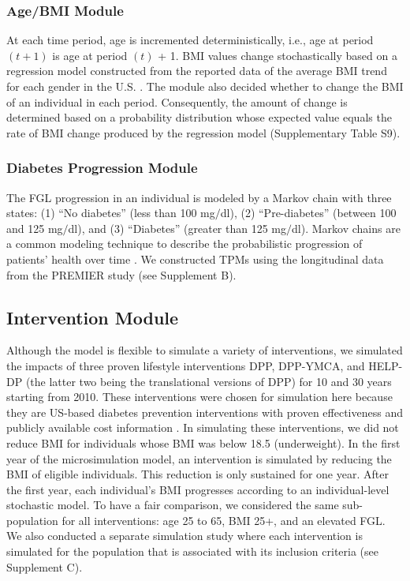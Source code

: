 \documentclass[fleqn,10pt]{wlscirep}
\begin{document}
\subsubsection*{Age/BMI Module}
At each time period, age is incremented deterministically, i.e., age at period $(t+1)$ is age at period $(t)$ + 1. BMI values change stochastically based on a regression model constructed from the reported data of the average BMI trend for each gender in the U.S. \cite{mcdowell:anthropometric:2005,mcdowell:anthropometric:2008,fryar:anthropometric:2012}. The module also decided whether to change the BMI of an individual in each period. Consequently, the amount of change is determined based on a probability distribution whose expected value equals the rate of BMI change produced by the regression model (Supplementary Table S9).

\subsubsection*{Diabetes Progression Module}
The FGL progression in an individual is modeled by a Markov chain with three states: (1) ``No diabetes'' (less than 100 mg$/$dl), (2) ``Pre-diabetes'' (between 100 and 125 mg$/$dl), and (3) ``Diabetes'' (greater than 125 mg$/$dl). Markov chains are a common modeling technique to describe the probabilistic progression of patients’ health over time \cite{sonnenberg:markov:1993}. We constructed TPMs using the longitudinal data from the PREMIER study (see Supplement B).

\subsection*{Intervention Module} 
Although the model is flexible to simulate a variety of interventions, we simulated the impacts of three proven lifestyle interventions DPP, DPP-YMCA, and HELP-DP (the latter two being the translational versions of DPP) for 10 and 30 years starting from 2010. 
These interventions were chosen for simulation here because they are US-based diabetes prevention interventions with proven effectiveness and publicly available cost information \cite{group:costs:2003,lawlor:cost:2013,ackermann:adapting:2007,vojta:2013:coordinated}.
In simulating these interventions, we did not reduce BMI for individuals whose BMI was below 18.5 (underweight). In the first year of the microsimulation model, an intervention is simulated by reducing the BMI of eligible individuals. This reduction is only sustained for one year. After the first year, each individual's BMI progresses according to an individual-level stochastic model. To have a fair comparison, we considered the same sub-population for all interventions: age 25 to 65, BMI 25+, and an elevated FGL. We also conducted a separate simulation study where each intervention is simulated for the population that is associated with its inclusion criteria (see Supplement C).
\end{document}
